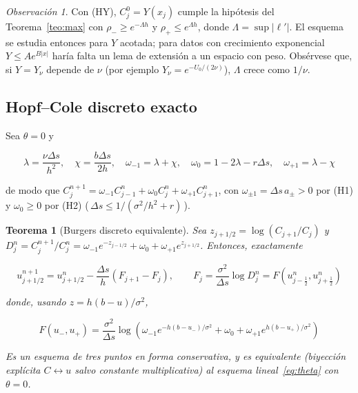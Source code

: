 \documentclass[11pt,letterpaper]{article}
\theoremstyle{plain}
\newtheorem{teorema}[theorem]{Teorema}
\theoremstyle{definition}
\theoremstyle{remark}
\newtheorem{observacion}[theorem]{Observación}
\numberwithin{equation}{section}
\begin{document}
	\begin{observacion}
		Con (HY), \(C^0_j=Y(x_j)\) cumple la hipótesis del Teorema~\ref{teo:max} con \(\rho_-\ge e^{-\Lambda h}\) y \(\rho_+\le e^{\Lambda h}\), donde \(\Lambda=\sup|\ell'|\). El esquema se estudia entonces para \(Y\) acotada; para datos con crecimiento exponencial \(Y\le Ae^{B|x|}\) haría falta un lema de extensión a un espacio con peso. Obsérvese que, si \(Y=Y_\nu\) depende de \(\nu\) (por ejemplo \(Y_\nu=e^{-U_0/(2\nu)}\)), \(\Lambda\) crece como \(1/\nu\).
	\end{observacion}
	
	\subsection{Hopf--Cole discreto exacto}\label{subsec:hc}
	
	Sea \(\theta=0\) y
	
	\[
	\lambda=\frac{\nu\Delta s}{h^2},\quad \chi=\frac{b\Delta s}{2h},\quad \omega_{-1}=\lambda+\chi,\quad \omega_0=1-2\lambda-r\Delta s,\quad \omega_{+1}=\lambda-\chi
	\]
	
	de modo que \(C^{n+1}_j=\omega_{-1}C^n_{j-1}+\omega_0C^n_j+\omega_{+1}C^n_{j+1}\), con \(\omega_{\pm1}=\Delta s\,a_\pm>0\) por (H1) y \(\omega_0\ge0\) por (H2) (\,\(\Delta s\le1/(\sigma^2/h^2+r)\)\,).
	
	\begin{teorema}[Burgers discreto equivalente]\label{teo:HC}
		Sea \(z_{j+1/2}=\log(C_{j+1}/C_j)\) y \(D^n_j=C^{n+1}_j/C^n_j=\omega_{-1}e^{-z_{j-1/2}}+\omega_0+\omega_{+1}e^{z_{j+1/2}}\). Entonces, exactamente
		
		\begin{equation}\label{eq:consform}
			u^{n+1}_{j+1/2}=u^n_{j+1/2}-\frac{\Delta s}{h}\left(F_{j+1}-F_j\right),\qquad F_j=\frac{\sigma^2}{\Delta s}\log D^n_j=F\left(u^n_{j-\frac12},u^n_{j+\frac12}\right)
		\end{equation}
		
		donde, usando \(z=h(b-u)/\sigma^2\),
		
		\[
		F(u_-,u_+)=\frac{\sigma^2}{\Delta s}\log\left(\omega_{-1}e^{-h(b-u_-)/\sigma^2}+\omega_0+\omega_{+1}e^{h(b-u_+)/\sigma^2}\right)
		\]
		
		Es un esquema de tres puntos en forma conservativa, y es equivalente (biyección explícita \(C\leftrightarrow u\) salvo constante multiplicativa) al esquema lineal~\eqref{eq:theta} con \(\theta=0\).
	\end{teorema}
	
\end{document}
